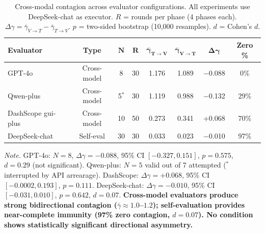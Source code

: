 \begin{table}[ht]
\centering
\caption{Cross-modal contagion across evaluator configurations. All experiments use DeepSeek-chat as executor. $R$ = rounds per phase (4 phases each). $\Delta\gamma = \bar{\gamma}_{V\to T} - \bar{\gamma}_{T\to V}$. $p$ = two-sided bootstrap (10,000 resamples). $d$ = Cohen's $d$.}
\label{tab:statistical}
\begin{tabular}{lccccccc}
\toprule
\textbf{Evaluator} & \textbf{Type} & $\mathbf{N}$ & $\mathbf{R}$ & $\mathbf{\bar{\gamma}_{T\to V}}$ & $\mathbf{\bar{\gamma}_{V\to T}}$ & $\mathbf{\Delta\gamma}$ & \textbf{Zero \%} \\
\midrule
GPT-4o            & Cross-model  & 8     & 30  & 1.176  & 1.089  & $-$0.088  & 0\% \\
Qwen-plus         & Cross-model  & 5$^*$ & 30  & 1.119  & 0.988  & $-$0.132  & 29\% \\
DashScope gui-plus & Cross-model & 10    & 50  & 0.273  & 0.341  & +0.068  & 70\% \\
DeepSeek-chat     & Self-eval    & 30    & 30  & 0.033  & 0.023  & $-$0.010  & 97\% \\
\bottomrule
\end{tabular}

\vspace{4pt}
\begin{minipage}{\textwidth}
\footnotesize
\textit{Note.} GPT-4o: $N=8$, $\Delta\gamma=-0.088$, 95\% CI $[-0.327, 0.151]$, $p=0.575$, $d=0.29$ (not significant). Qwen-plus: $N=5$ valid out of 7 attempted ($^*$interrupted by API arrearage). DashScope: $\Delta\gamma=+0.068$, 95\% CI $[-0.0002, 0.193]$, $p=0.111$. DeepSeek-chat: $\Delta\gamma=-0.010$, 95\% CI $[-0.031, 0.010]$, $p=0.642$, $d=0.07$. \textbf{Cross-model evaluators produce strong bidirectional contagion ($\bar{\gamma} \approx 1.0$--$1.2$); self-evaluation provides near-complete immunity (97\% zero contagion, $d=0.07$). No condition shows statistically significant directional asymmetry.}
\end{minipage}
\end{table}
